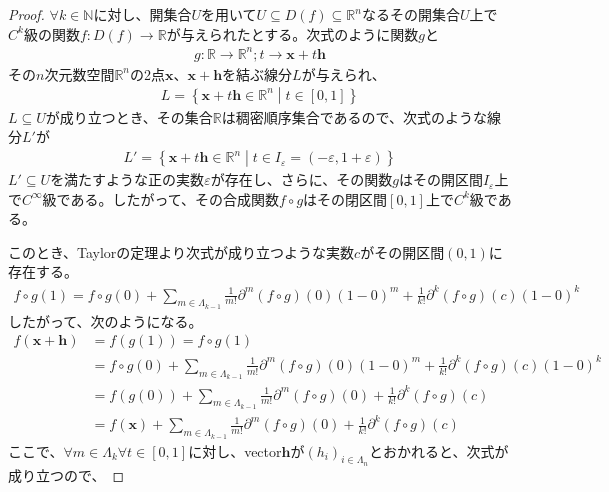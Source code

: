 \documentclass[dvipdfmx]{jsarticle}
\begin{document}
\begin{proof}
$\forall k \in \mathbb{N}$に対し、開集合$U$を用いて$U \subseteq D(f) \subseteq \mathbb{R}^{n}$なるその開集合$U$上で$C^{k}$級の関数$f:D(f) \rightarrow \mathbb{R}$が与えられたとする。次式のように関数$g$と
\begin{align*}
g:\mathbb{R} \rightarrow \mathbb{R}^{n};t \rightarrow \mathbf{x} + t\mathbf{h}
\end{align*}
その$n$次元数空間$\mathbb{R}^{n}$の2点$\mathbf{x}$、$\mathbf{x} + \mathbf{h}$を結ぶ線分$L$が与えられ、
\begin{align*}
L = \left\{ \mathbf{x} + t\mathbf{h} \in \mathbb{R}^{n} \middle| t \in [ 0,1] \right\}
\end{align*}
$L \subseteq U$が成り立つとき、その集合$\mathbb{R}$は稠密順序集合であるので、次式のような線分$L'$が
\begin{align*}
L' = \left\{ \mathbf{x} + t\mathbf{h} \in \mathbb{R}^{n} \middle| t \in I_{\varepsilon} = ( - \varepsilon,1 + \varepsilon) \right\}
\end{align*}
$L' \subseteq U$を満たすような正の実数$\varepsilon$が存在し、さらに、その関数$g$はその開区間$I_{\varepsilon}$上で$C^{\infty}$級である。したがって、その合成関数$f \circ g$はその閉区間$[ 0,1]$上で$C^{k}$級である。\par
このとき、Taylorの定理より次式が成り立つような実数$c$がその開区間$(0,1)$に存在する。
\begin{align*}
f \circ g(1) = f \circ g(0) + \sum_{m \in \varLambda_{k - 1}} {\frac{1}{m!}\partial^{m}(f \circ g)(0)(1 - 0)^{m}} + \frac{1}{k!}\partial^{k}(f \circ g)(c)(1 - 0)^{k}
\end{align*}
したがって、次のようになる。
\begin{align*}
f\left( \mathbf{x} + \mathbf{h} \right) &= f\left( g(1) \right) = f \circ g(1)\\
&= f \circ g(0) + \sum_{m \in \varLambda_{k - 1}} {\frac{1}{m!}\partial^{m}(f \circ g)(0)(1 - 0)^{m}} + \frac{1}{k!}\partial^{k}(f \circ g)(c)(1 - 0)^{k}\\
&= f\left( g(0) \right) + \sum_{m \in \varLambda_{k - 1}} {\frac{1}{m!}\partial^{m}(f \circ g)(0)} + \frac{1}{k!}\partial^{k}(f \circ g)(c)\\
&= f\left( \mathbf{x} \right) + \sum_{m \in \varLambda_{k - 1}} {\frac{1}{m!}\partial^{m}(f \circ g)(0)} + \frac{1}{k!}\partial^{k}(f \circ g)(c)
\end{align*}
ここで、$\forall m \in \varLambda_{k}\forall t \in [ 0,1]$に対し、vector$\mathbf{h}$が$\left( h_{i} \right)_{i \in \varLambda_{n}}$とおかれると、次式が成り立つので、

\end{proof}
\end{document}
